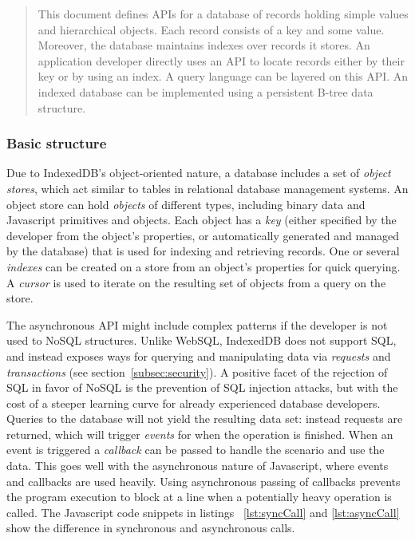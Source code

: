 \begin{quote}
This document defines APIs for a database of records holding simple values and hierarchical objects. Each record consists of a key and some value. Moreover, the database maintains indexes over records it stores. An application developer directly uses an API to locate records either by their key or by using an index. A query language can be layered on this API. An indexed database can be implemented using a persistent B-tree data structure.
\end{quote}

\subsubsection{Basic structure}
Due to IndexedDB's object-oriented nature, a database includes a set of \emph{object stores}, which act similar to tables in relational database management systems. An object store can hold \emph{objects} of different types, including binary data and Javascript primitives and objects. Each object has a \emph{key} (either specified by the developer from the object's properties, or automatically generated and managed by the database) that is used for indexing and retrieving records. One or several \emph{indexes} can be created on a store from an object's properties for quick querying. A \emph{cursor} is used to iterate on the resulting set of objects from a query on the store.

The asynchronous API might include complex patterns if the developer is not used to NoSQL structures. Unlike WebSQL, IndexedDB does not support SQL, and instead exposes ways for querying and manipulating data via \emph{requests} and \emph{transactions} (see section~\ref{subsec:security}). A positive facet of the rejection of SQL in favor of NoSQL is the prevention of SQL injection attacks, but with the cost of a steeper learning curve for already experienced database developers. Queries to the database will not yield the resulting data set: instead requests are returned, which will trigger \emph{events} for when the operation is finished. When an event is triggered a \emph{callback} can be passed to handle the scenario and use the data. This goes well with the asynchronous nature of Javascript, where events and callbacks are used heavily. Using asynchronous passing of callbacks prevents the program execution to block at a line when a potentially heavy operation is called. The Javascript code snippets in listings ~\ref{lst:syncCall} and \ref{lst:asyncCall} show the difference in synchronous and asynchronous calls.

